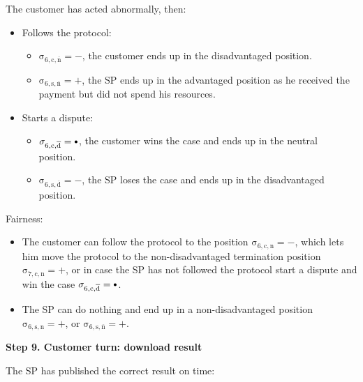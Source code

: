 \documentclass{ieeeaccess}
\newcommand\neutral[1][.75]{\mathbin{\ThisStyle{\vcenter{\hbox{%
  \scalebox{#1}{$\SavedStyle\bullet$}}}}}%
}
\begin{document}
The customer has acted abnormally, then:

\begin{itemize}
\item
  Follows the protocol:

  \begin{itemize}
  
  \item
    \(\operatorname{\sigma_{6, c, \overline{n}} = -}\), the customer ends up in the disadvantaged position.
  \item
    \(\operatorname{\sigma_{6, s, \overline{n}} = +}\), the SP ends up in the advantaged position as he received the payment but did not spend his resources.
  \end{itemize}
\item
  Starts a dispute:

  \begin{itemize}
  
  \item
    \(\operatorname{\sigma_{6, c, \overline{d}} = \neutral}\), the customer wins the case and ends up in the neutral position.
  \item
    \(\operatorname{\sigma_{6, s, \overline{d}} = -}\), the SP loses the case and ends up in the disadvantaged position.
  \end{itemize}
\end{itemize}

Fairness:

\begin{itemize}

\item
  The customer can follow the protocol to the position \(\operatorname{\sigma_{6, c, n} = -}\), which lets him move the protocol to the non-disadvantaged termination position \(\operatorname{\sigma_{7, c, n} = +}\), or in case the SP has not followed the protocol start a dispute and win the case \(\operatorname{\sigma_{6, c, \overline{d}} = \neutral}\).
\item
  The SP can do nothing and end up in a non-disadvantaged position \(\operatorname{\sigma_{6, s, n} = +}\), or \(\operatorname{\sigma_{6, s, \overline{n}} = +}\).
\end{itemize}

\noindent \textbf
{Step 9. Customer turn: download result}\label{step-9-retrieval-of-results}

The SP has published the correct result on time:
\end{document}
